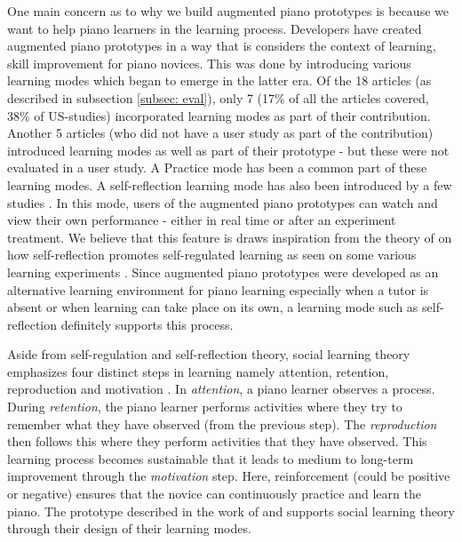 \documentclass[sigconf, screen, review]{acmart}
\begin{document}
One main concern as to why we build augmented piano prototypes is because we want to help piano learners in the learning process. Developers have created augmented piano prototypes in a way that is considers the context of learning, skill improvement for piano novices. This was done by introducing various learning modes which began to emerge in the latter era. Of the 18 articles (as described in subsection \ref{subsec: eval}), only 7 (17\% of all the articles covered, 38\% of US-studies) incorporated learning modes as part of their contribution. Another 5 articles (who did not have a user study as part of the contribution) introduced learning modes as well as part of their prototype - but these were not evaluated in a user study. A Practice mode has been a common part of these learning modes. A self-reflection learning mode has also been introduced by a few studies \cite{gerry2019adept, xu20195, xiao2013mirrorfugue}. In this mode, users of the augmented piano prototypes can watch and view their own performance - either in real time or after an experiment treatment. We believe that this feature is draws inspiration from the theory of \citet{zimmerman2009self} on how self-reflection promotes self-regulated learning as seen on some various learning experiments \cite{deja2016discovering,lyons2011monitoring}. Since augmented piano prototypes were developed as an alternative learning environment for piano learning especially when a tutor is absent or when learning can take place on its own, a learning mode such as self-reflection definitely supports this process. 

Aside from self-regulation and self-reflection theory, social learning theory emphasizes four distinct steps in learning namely attention, retention, reproduction and motivation \cite{bandura1977social}. In \textit{attention}, a piano learner observes a process. During \textit{retention}, the piano learner performs activities where they try to remember what they have observed (from the previous step). The \textit{reproduction} then follows this where they perform activities that they have observed. This learning process becomes sustainable that it leads to medium to long-term improvement through the \textit{motivation} step. Here, reinforcement (could be positive or negative) ensures that the novice can continuously practice and learn the piano. The prototype described in the work of \citet{weing2013piano} and \citet{rogers2014piano} supports social learning theory through their design of their learning modes. 
\end{document}
